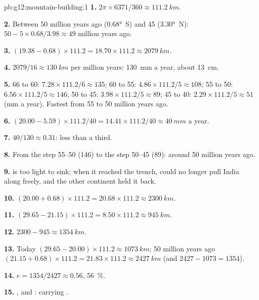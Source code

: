 \begin{solution}{pb:g12:mountain-building:1}
\textbf{1.} $2\pi \times 6371/360 \approx \qty{111.2}{km}$.

\textbf{2.} Between 50 million years ago (\ang{0.68}~S) and 45 (\ang{3.30}~N):
$50 - 5 \times 0.68/3.98 \approx 49$ million years ago.

\textbf{3.} $(19.38 - 0.68) \times 111.2 = 18.70 \times 111.2 \approx
\qty{2079}{km}$.

\textbf{4.} $2079/16 \approx \qty{130}{km}$ per million years: \qty{130}{mm}
a year, about \qty{13}{cm}.

\textbf{5.} 66 to 60: $7.28 \times 111.2/6 \approx 135$; 60 to 55: $4.86
\times 111.2/5 \approx 108$; 55 to 50: $6.56 \times 111.2/5 \approx 146$; 50
to 45: $3.98 \times 111.2/5 \approx 89$; 45 to 40: $2.29 \times 111.2/5
\approx 51$ (\unit{mm} a year). Fastest from 55 to 50 million years ago.

\textbf{6.} $(20.00 - 5.59) \times 111.2/40 = 14.41 \times 111.2/40 \approx
\qty{40}{mm}$ a year.

\textbf{7.} $40/130 \approx 0.31$: less than a third.

\textbf{8.} From the step 55--50 (146) to the step 50--45 (89): around 50
million years ago.

\textbf{9.}  is too light to sink: when it reached the
trench,  could no longer pull India along freely, and the other
continent held it back.

\textbf{10.} $(20.00 + 0.68) \times 111.2 = 20.68 \times 111.2 \approx
\qty{2300}{km}$.

\textbf{11.} $(29.65 - 21.15) \times 111.2 = 8.50 \times 111.2 \approx
\qty{945}{km}$.

\textbf{12.} $2300 - 945 \approx \qty{1354}{km}$.

\textbf{13.} Today $(29.65 - 20.00) \times 111.2 \approx \qty{1073}{km}$;
50 million years ago $(21.15 + 0.68) \times 111.2 = 21.83 \times 111.2
\approx \qty{2427}{km}$ (and $2427 - 1073 = 1354$).

\textbf{14.} $e = 1354/2427 \approx 0.56$, \qty{56}{\percent}.

\textbf{15.} , and :  carrying .


\end{solution}
